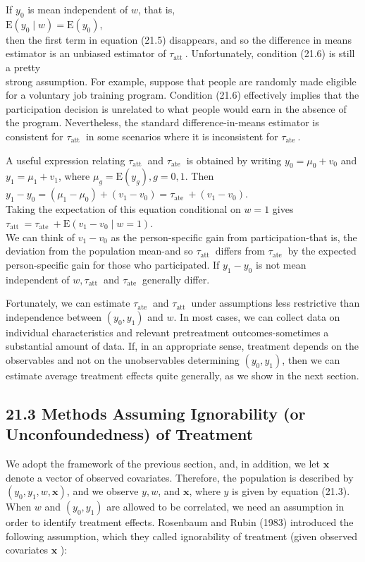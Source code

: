 \documentclass[10pt]{article}
\begin{document}
If $y_{0}$ is mean independent of $w$, that is,\\
$\mathrm{E}\left(y_{0} \mid w\right)=\mathrm{E}\left(y_{0}\right)$,\\
then the first term in equation (21.5) disappears, and so the difference in means estimator is an unbiased estimator of $\tau_{\text {att }}$. Unfortunately, condition (21.6) is still a pretty\\
strong assumption. For example, suppose that people are randomly made eligible for a voluntary job training program. Condition (21.6) effectively implies that the participation decision is unrelated to what people would earn in the absence of the program. Nevertheless, the standard difference-in-means estimator is consistent for $\tau_{\text {att }}$ in some scenarios where it is inconsistent for $\tau_{\text {ate }}$.

A useful expression relating $\tau_{\text {att }}$ and $\tau_{\text {ate }}$ is obtained by writing $y_{0}=\mu_{0}+v_{0}$ and $y_{1}=\mu_{1}+v_{1}$, where $\mu_{g}=\mathrm{E}\left(y_{g}\right), g=0,1$. Then\\
$y_{1}-y_{0}=\left(\mu_{1}-\mu_{0}\right)+\left(v_{1}-v_{0}\right)=\tau_{\text {ate }}+\left(v_{1}-v_{0}\right)$.\\
Taking the expectation of this equation conditional on $w=1$ gives\\
$\tau_{\text {att }}=\tau_{\text {ate }}+\mathrm{E}\left(v_{1}-v_{0} \mid w=1\right)$.\\
We can think of $v_{1}-v_{0}$ as the person-specific gain from participation-that is, the deviation from the population mean-and so $\tau_{\text {att }}$ differs from $\tau_{\text {ate }}$ by the expected person-specific gain for those who participated. If $y_{1}-y_{0}$ is not mean independent of $w, \tau_{\text {att }}$ and $\tau_{\text {ate }}$ generally differ.

Fortunately, we can estimate $\tau_{\text {ate }}$ and $\tau_{\text {att }}$ under assumptions less restrictive than independence between $\left(y_{0}, y_{1}\right)$ and $w$. In most cases, we can collect data on individual characteristics and relevant pretreatment outcomes-sometimes a substantial amount of data. If, in an appropriate sense, treatment depends on the observables and not on the unobservables determining $\left(y_{0}, y_{1}\right)$, then we can estimate average treatment effects quite generally, as we show in the next section.

\subsection*{21.3 Methods Assuming Ignorability (or Unconfoundedness) of Treatment}
We adopt the framework of the previous section, and, in addition, we let $\mathbf{x}$ denote a vector of observed covariates. Therefore, the population is described by $\left(y_{0}, y_{1}, w, \mathbf{x}\right)$, and we observe $y, w$, and $\mathbf{x}$, where $y$ is given by equation (21.3). When $w$ and $\left(y_{0}, y_{1}\right)$ are allowed to be correlated, we need an assumption in order to identify treatment effects. Rosenbaum and Rubin (1983) introduced the following assumption, which they called ignorability of treatment (given observed covariates $\mathbf{x}$ ):
\end{document}
